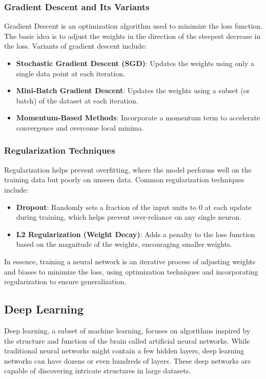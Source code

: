 \subsubsection{Gradient Descent and Its Variants}

Gradient Descent is an optimization algorithm used to minimize the loss function. The basic idea is to adjust the weights in the direction of the steepest decrease in the loss. Variants of gradient descent include:
\begin{itemize}
    \item \textbf{Stochastic Gradient Descent (SGD)}: Updates the weights using only a single data point at each iteration.
    \item \textbf{Mini-Batch Gradient Descent}: Updates the weights using a subset (or batch) of the dataset at each iteration.
    \item \textbf{Momentum-Based Methods}: Incorporate a momentum term to accelerate convergence and overcome local minima.
\end{itemize}

\subsubsection{Regularization Techniques}

Regularization helps prevent overfitting, where the model performs well on the training data but poorly on unseen data. Common regularization techniques include:
\begin{itemize}
    \item \textbf{Dropout}: Randomly sets a fraction of the input units to 0 at each update during training, which helps prevent over-reliance on any single neuron.
    \item \textbf{L2 Regularization (Weight Decay)}: Adds a penalty to the loss function based on the magnitude of the weights, encouraging smaller weights.
\end{itemize}

In essence, training a neural network is an iterative process of adjusting weights and biases to minimize the loss, using optimization techniques and incorporating regularization to ensure generalization.

\subsection{Deep Learning}

Deep learning, a subset of machine learning, focuses on algorithms inspired by the structure and function of the brain called artificial neural networks. While traditional neural networks might contain a few hidden layers, deep learning networks can have dozens or even hundreds of layers. These deep networks are capable of discovering intricate structures in large datasets.

